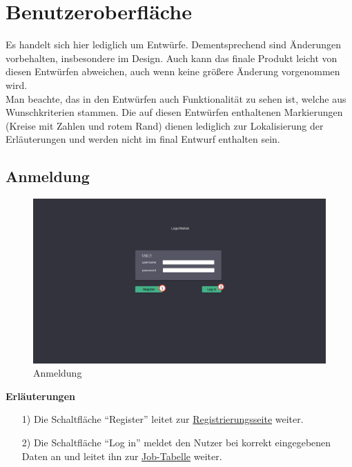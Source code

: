\section{Benutzeroberfläche}

Es handelt sich hier lediglich um Entwürfe. Dementsprechend sind Änderungen vorbehalten, insbesondere im Design. Auch kann das finale Produkt leicht von diesen Entwürfen abweichen, auch wenn keine größere Änderung vorgenommen wird.\\
Man beachte, das in den Entwürfen auch Funktionalität zu sehen ist, welche aus Wunschkriterien stammen. Die auf diesen Entwürfen enthaltenen Markierungen (Kreise mit Zahlen und rotem Rand) dienen lediglich zur Lokalisierung der Erläuterungen und werden nicht im final Entwurf enthalten sein.
\subsection{Anmeldung}
\label{pages:login}
\begin{figure}[H]
    \centering
    \includegraphics[width=\textwidth]{images-interface/v3_interface/login_page_v3.pdf}
    \caption{Anmeldung}
    \label{fig:login}
\end{figure}
\textbf{Erläuterungen}
\begin{itemize}
    \item[1)] Die Schaltfläche \enquote{Register} leitet zur \hyperref[pages:register]{Registrierungsseite} weiter.
    \item[2)] Die Schaltfläche \enquote{Log in} meldet den Nutzer bei korrekt eingegebenen Daten an und leitet ihn zur \hyperref[pages:job-table]{Job-Tabelle} weiter.
\end{itemize}

